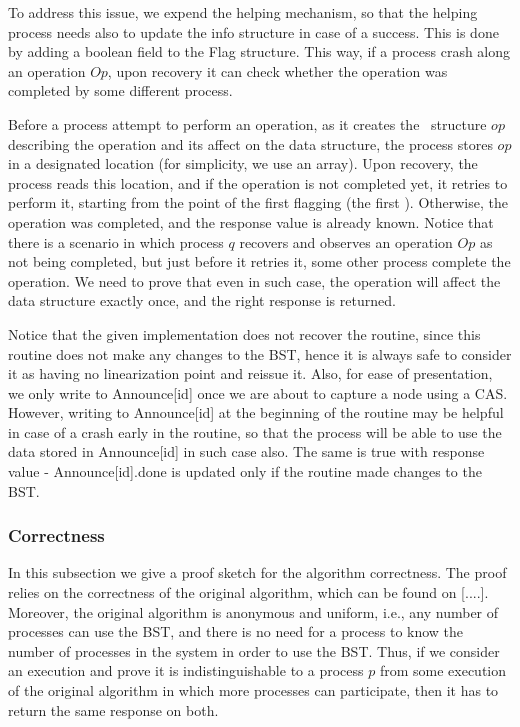 To address this issue, we expend the helping mechanism, so that the helping process needs also to update the info structure in case of a success. This is done by adding a boolean field to the Flag structure. This way, if a process crash along an operation $Op$, upon recovery it can check whether the operation was completed by some different process. 

Before a process attempt to perform an operation, as it creates the \Flag\ structure $op$ describing the operation and its affect on the data structure, the process stores $op$ in a designated location (for simplicity, we use an array). Upon recovery, the process reads this location, and if the operation is not completed yet, it retries to perform it, starting from the point of the first flagging (the first \CASB). Otherwise, the operation was completed, and the response value is already known. Notice that there is a scenario in which process $q$ recovers and observes an operation $Op$ as not being completed, but just before it retries it, some other process complete the operation. We need to prove that even in such case, the operation will affect the data structure exactly once, and the right response is returned.

Notice that the given implementation does not recover the  routine, since this routine does not make any changes to the BST, hence it is always safe to consider it as having no linearization point and reissue it. Also, for ease of presentation, we only write to Announce[id] once we are about to capture a node using a CAS. However, writing to Announce[id] at the beginning of the routine may be helpful in case of a crash early in the routine, so that the process will be able to use the data stored in Announce[id] in such case also. The same is true with response value - Announce[id].done is updated only if the routine made changes to the BST.

\subsubsection{Correctness}
In this subsection we give a proof sketch for the algorithm correctness. The proof relies on the correctness of the original algorithm, which can be found on [....]. Moreover, the original algorithm is anonymous and uniform, i.e., any number of processes can use the BST, and there is no need for a process to know the number of processes in the system in order to use the BST. Thus, if we consider an execution and prove it is indistinguishable to a process $p$ from some execution of the original algorithm in which more processes can participate, then it has to return the same response on both.

